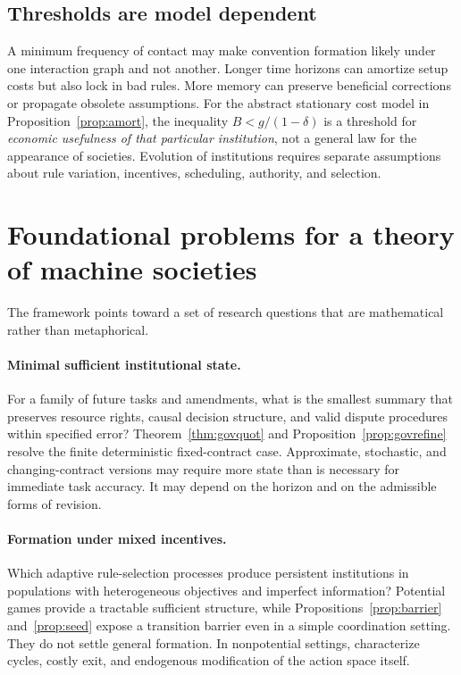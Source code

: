 \documentclass[11pt,letterpaper]{article}
\theoremstyle{plain}
\theoremstyle{definition}
\theoremstyle{remark}
\begin{document}
\subsection{Thresholds are model dependent}

A minimum frequency of contact may make convention formation likely under one interaction graph and not another. Longer time horizons can amortize setup costs but also lock in bad rules. More memory can preserve beneficial corrections or propagate obsolete assumptions. For the abstract stationary cost model in Proposition~\ref{prop:amort}, the inequality $B<g/(1-\delta)$ is a threshold for \emph{economic usefulness of that particular institution}, not a general law for the appearance of societies. Evolution of institutions requires separate assumptions about rule variation, incentives, scheduling, authority, and selection.

\section{Foundational problems for a theory of machine societies}\label{sec:problems}

The framework points toward a set of research questions that are mathematical rather than metaphorical.

\paragraph{Minimal sufficient institutional state.}
For a family of future tasks and amendments, what is the smallest summary that preserves resource rights, causal decision structure, and valid dispute procedures within specified error? Theorem~\ref{thm:govquot} and Proposition~\ref{prop:govrefine} resolve the finite deterministic fixed-contract case. Approximate, stochastic, and changing-contract versions may require more state than is necessary for immediate task accuracy. It may depend on the horizon and on the admissible forms of revision.

\paragraph{Formation under mixed incentives.}
Which adaptive rule-selection processes produce persistent institutions in populations with heterogeneous objectives and imperfect information? Potential games provide a tractable sufficient structure, while Propositions~\ref{prop:barrier} and~\ref{prop:seed} expose a transition barrier even in a simple coordination setting. They do not settle general formation. In nonpotential settings, characterize cycles, costly exit, and endogenous modification of the action space itself.
\end{document}
